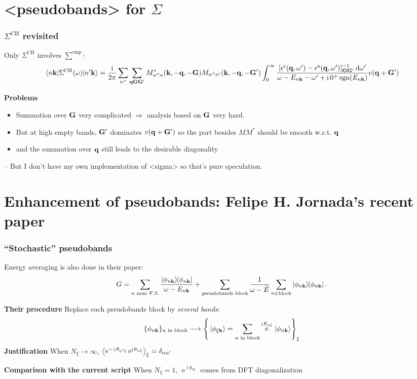 \documentclass[t,aspectratio=169]{beamer}
\DeclareMathOperator{\ee}{e}
\DeclareMathOperator{\ii}{i}
\DeclareMathOperator{\sgn}{sgn}
\newcommand{\shortcode}[1]{\texttt{#1}}
\def\texttt#1{<#1>}%
\begin{document}
\section{\shortcode{pseudobands} for $\Sigma$}

\begin{frame}
\frametitle{$\Sigma^{\text{CH}}$ revisited}

Only $\Sigma^{\text{CH}}$ involves $\sum^{\text{emp}}$:
\scriptsize
\begin{equation*}
    \mel{n \vb{k}}{\Sigma^{\text{CH}}(\omega)}{n' \vb{k}} 
    = \frac{\ii}{2\pi} \sum_{n''} \sum_{\vb{q} \vb{G} \vb{G}'} 
    M^*_{n'' n} (\vb{k}, - \vb{q}, - \vb{G})  M_{n'' n'} (\vb{k}, - \vb{q},  -\vb{G}') 
    \int_{0}^{\infty} 
    \frac{
    [\epsilon^{\text{r}}(\vb{q}, \omega') - \epsilon^{\text{a}}(\vb{q}, \omega')]_{\vb{G} \vb{G}'}^{-1} 
    \dd{\omega'} 
    }{\omega - E_{n \vb{k}} - \omega' + \ii 0^+ \sgn(E_{n \vb{k}})} v(\vb{q}+\vb{G}')
    \label{eq:ch.simple}
\end{equation*}
\normalsize

\textbf{Problems} \begin{itemize}
    \item Summation over $\vb{G}$ very complicated $\Rightarrow$
    analysis based on $\vb{G}$ very hard.
    \item But at high empty bands, $\vb{G}'$ dominates $v(\vb{q} + \vb{G}')$ so the part besides $MM^*$ should be smooth w.r.t. $\vb{q}$
    \item and the summation over $\vb{q}$ still leads to the desirable diagonality 
\end{itemize}

-- But I don't have my own implementation of \shortcode{sigma} so that's pure speculation.

\end{frame}

\section{Enhancement of pseudobands: Felipe H. Jornada's recent paper}

\begin{frame}
\frametitle{``Stochastic'' pseudobands}

Energy averaging is also done in their paper:
\[
    G = \sum_{\text{$n$ near F.S.}} \frac{\dyad{\phi_{n \vb{k}}}}{\omega - E_{n \vb{k}}} + \sum_{\text{pseudobands block}} \frac{1}{\omega - \bar{E}} \sum_{n \in \text{block}} \dyad{\phi_{n \vb{k}}}.
\]     

\textbf{Their procedure} Replace each pseudobands block by \emph{several bands}:
\[
    \{\phi_{n \vb{k}}\}_{\text{$n$ in block}} \longrightarrow
    \left\{
        \ket*{\phi_{\xi \vb{k}}} = \sum_{\text{$n$ in block}} 
        \ee^{\ii \theta_{n \xi}} \ket*{\phi_{n \vb{k}}}
    \right\}_\xi
\]
\textbf{Justification} When $N_\xi \to \infty$, 
$\expval{
    \ee^{- \ii \theta_{n' \xi}} \ee^{\ii \theta_{n \xi}}
}_\xi = \delta_{n n'}$

\textbf{Comparison with the current script} When $N_\xi = 1$, 
$\ee^{\ii \theta_{n \xi}}$ comes from DFT diagonalization

\end{frame}
\end{document}
